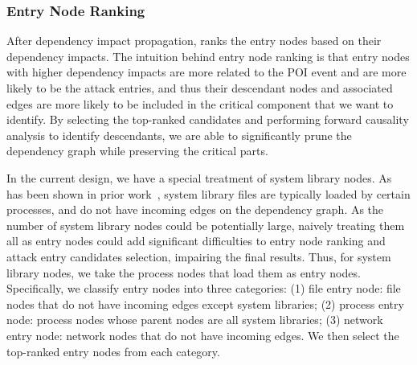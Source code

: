 \subsubsection{Entry Node Ranking}
\label{subsubsec:entry-ranking}
After dependency impact propagation, \tool ranks the entry nodes
based on their dependency impacts.
%
The intuition behind entry node ranking is that entry nodes with higher dependency impacts are more related to the POI event and are more likely to be the attack entries, and thus their 
descendant nodes and associated edges are more likely to be included in the critical component that we want to identify.
%
By selecting the top-ranked candidates and performing forward causality analysis to identify descendants, we are able to significantly prune the dependency graph while preserving the critical parts.

In the current design, we have a special treatment of system library nodes. 
As has been shown in prior work~\cite{reduction2}, system library files are typically loaded by certain processes, and do not have incoming edges on the dependency graph.
As the number of system library nodes could be potentially large, naively treating them all as entry nodes could add significant difficulties to entry node ranking and attack entry candidates selection, impairing the final results.
Thus, for system library nodes, we take the process nodes that load them as entry nodes.
%
Specifically, 
we classify entry nodes into three categories: (1) file entry node: file nodes that do not have incoming edges except system libraries; (2) process entry node: process nodes whose parent nodes are all system libraries; (3) network entry node: network nodes that do not have incoming edges. 
We then select the top-ranked entry nodes from each category.








